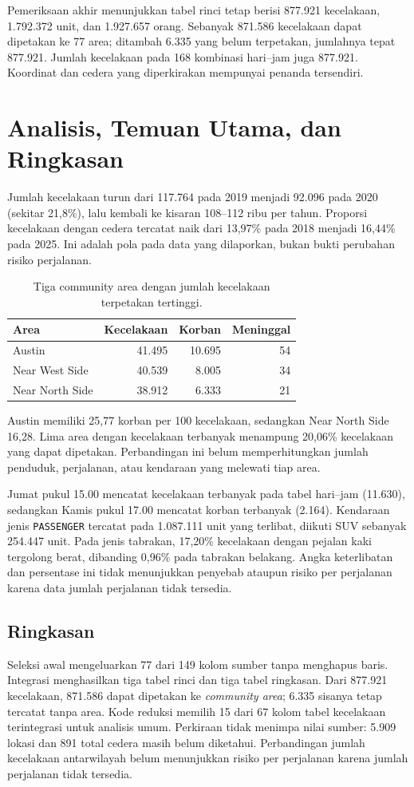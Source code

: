 \documentclass[10pt,a4paper]{article}
\begin{document}
Pemeriksaan akhir menunjukkan tabel rinci tetap berisi 877.921
kecelakaan, 1.792.372 unit, dan 1.927.657 orang. Sebanyak 871.586
kecelakaan dapat dipetakan ke 77 area; ditambah 6.335 yang belum
terpetakan, jumlahnya tepat 877.921. Jumlah kecelakaan pada 168
kombinasi hari--jam juga 877.921. Koordinat dan cedera yang diperkirakan
mempunyai penanda tersendiri.

\section{Analisis, Temuan Utama, dan Ringkasan}

Jumlah kecelakaan turun dari 117.764 pada 2019 menjadi 92.096 pada 2020
(sekitar 21,8\%), lalu kembali ke kisaran 108--112 ribu per tahun.
Proporsi kecelakaan dengan cedera tercatat naik dari 13,97\% pada 2018
menjadi 16,44\% pada 2025. Ini adalah pola pada data yang dilaporkan,
bukan bukti perubahan risiko perjalanan.

\begin{table}[H]
\centering\small
\caption{Tiga community area dengan jumlah kecelakaan terpetakan tertinggi.}
\begin{tabular}{lrrr}
\toprule
Area & Kecelakaan & Korban & Meninggal\\
\midrule
Austin & 41.495 & 10.695 & 54\\
Near West Side & 40.539 & 8.005 & 34\\
Near North Side & 38.912 & 6.333 & 21\\
\bottomrule
\end{tabular}
\end{table}

Austin memiliki 25,77 korban per 100 kecelakaan, sedangkan Near North Side
16,28. Lima area dengan kecelakaan terbanyak menampung 20,06\% kecelakaan
yang dapat dipetakan. Perbandingan ini belum memperhitungkan jumlah
penduduk, perjalanan, atau kendaraan yang melewati tiap area.

Jumat pukul 15.00 mencatat kecelakaan terbanyak pada tabel hari--jam
(11.630), sedangkan Kamis pukul 17.00 mencatat korban terbanyak
(2.164). Kendaraan jenis \texttt{PASSENGER} tercatat pada 1.087.111 unit
yang terlibat, diikuti SUV sebanyak 254.447 unit. Pada jenis tabrakan,
17,20\% kecelakaan dengan pejalan kaki tergolong berat, dibanding 0,96\%
pada tabrakan belakang. Angka keterlibatan dan persentase ini tidak
menunjukkan penyebab ataupun risiko per perjalanan karena data jumlah
perjalanan tidak tersedia.

\subsection*{Ringkasan}
Seleksi awal mengeluarkan 77 dari 149 kolom sumber tanpa menghapus baris.
Integrasi menghasilkan tiga tabel rinci dan tiga tabel ringkasan. Dari
877.921 kecelakaan, 871.586 dapat dipetakan ke \emph{community area};
6.335 sisanya tetap tercatat tanpa area. Kode reduksi memilih 15 dari 67
kolom tabel kecelakaan terintegrasi untuk analisis umum. Perkiraan tidak
menimpa nilai sumber: 5.909 lokasi dan 891 total cedera masih belum
diketahui. Perbandingan jumlah kecelakaan antarwilayah belum menunjukkan
risiko per perjalanan karena jumlah perjalanan tidak tersedia.
\end{document}

